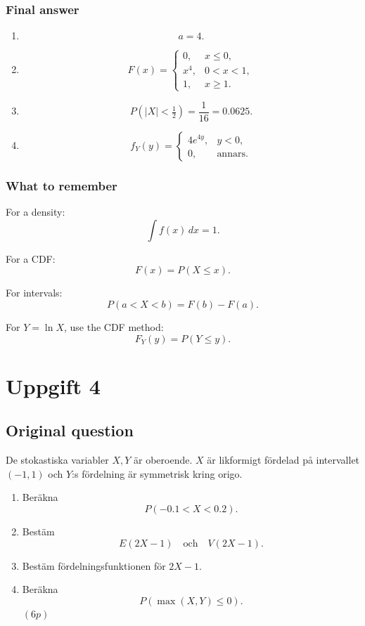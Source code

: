 \documentclass[10pt]{article}
\begin{document}
\subsubsection*{Final answer}

\begin{enumerate}[label=\alph*)]
\item
\[
a=4.
\]

\item
\[
F(x)=
\begin{cases}
0,
& x\le 0,\\
x^4,
& 0<x<1,\\
1,
& x\ge 1.
\end{cases}
\]

\item
\[
P(|X|<\tfrac12)
=
\frac{1}{16}
=0.0625.
\]

\item
\[
f_Y(y)=
\begin{cases}
4e^{4y},
& y<0,\\
0,
& \text{annars}.
\end{cases}
\]
\end{enumerate}

\subsubsection*{What to remember}

For a density:
\[
\int f(x)\,dx=1.
\]

For a CDF:
\[
F(x)=P(X\le x).
\]

For intervals:
\[
P(a<X<b)=F(b)-F(a).
\]

For \(Y=\ln X\), use the CDF method:
\[
F_Y(y)=P(Y\le y).
\]

\section*{Uppgift 4}

\subsection*{Original question}

De stokastiska variabler \(X,Y\) är oberoende.
\(X\) är likformigt fördelad på intervallet
\((-1,1)\) och \(Y\):s fördelning är symmetrisk
kring origo.

\begin{enumerate}[label=\alph*)]
\item Beräkna
\[
P(-0.1<X<0.2).
\]

\item Bestäm
\[
E(2X-1)
\quad\text{och}\quad
V(2X-1).
\]

\item Bestäm fördelningsfunktionen för \(2X-1\).

\item Beräkna
\[
P(\max(X,Y)\le 0).
\]
\((6p)\)
\end{enumerate}
\end{document}

